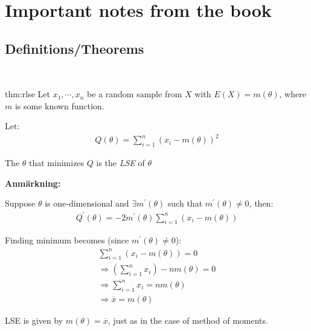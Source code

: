 \section{Important notes from the book}\par
\subsection{Definitions/Theorems}\hfill\\\par
\begin{theo}{thm:rlse}
  Let $x_1,\cdots,x_n$ be a random sample from $X$ with $E(X) = m(\theta)$, where $m$ is some known function.\par
  \noindent Let:
  \begin{equation*}
    \begin{gathered}
      Q(\theta) = \sum_{i=1}^{n}(x_i-m(\theta))^2
    \end{gathered}
  \end{equation*}
  \par\bigskip
  \noindent The $\theta$ that minimizes $Q$ is the \textit{LSE} of $\theta$
\end{theo}
\par\bigskip
\noindent\textbf{Anmärkning:}\par
\noindent Suppose $\theta$ is one-dimensional and $\exists m^{\prime}(\theta)$ such that $m^{\prime}(\theta)\neq0$, then:
\begin{equation*}
  \begin{gathered}
    Q^{\prime}(\theta) = -2m^{\prime}(\theta)\sum_{i=1}^{n}(x_i-m(\theta))
  \end{gathered}
\end{equation*}\par
\noindent Finding minimum becomes (since $m^{\prime}(\theta)\neq0$):
\begin{equation*}
  \begin{gathered}
    \sum_{i=1}^{n}(x_i-m(\theta)) = 0\\
    \Rightarrow  \left(\sum_{i=1}^{n}x_i\right)-nm(\theta) = 0\\
    \Rightarrow \sum_{i=1}^{n}x_i = nm(\theta)\\
    \Rightarrow \overline{x} = m(\theta)
  \end{gathered}
\end{equation*}\par
\noindent LSE is given by $m(\theta) = \overline{x}$, just as in the case of method of moments.
